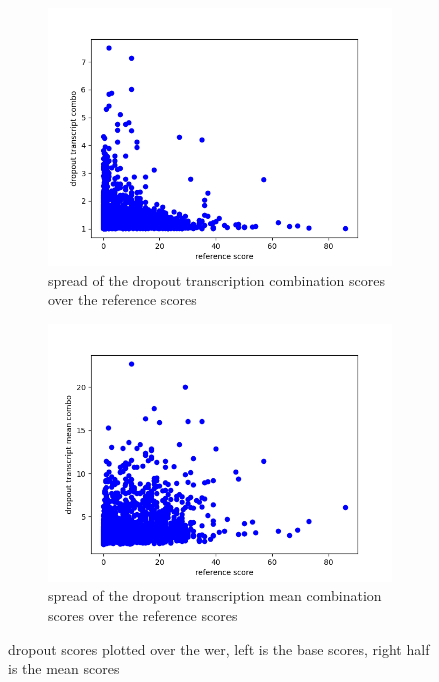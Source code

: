 \begin{figure}[h]
\begin{subfigure}{0.4\linewidth}
        \includegraphics[width=\textwidth]{Latex/sections/images/seamlessdropouttranscriptcombo.png}
        \caption{spread of the dropout transcription combination scores over the reference scores}
    \end{subfigure}
    \begin{subfigure}{0.4\linewidth}
        \includegraphics[width=\textwidth]{Latex/sections/images/seamlessdropouttranscriptmeancombo.png}
        \caption{spread of the dropout transcription mean combination scores over the reference scores}
    \end{subfigure}
    \caption{dropout scores plotted over the wer, left is the base scores, right half is the mean scores}
    \label{fig:dropout transcript scores}
\end{figure}

